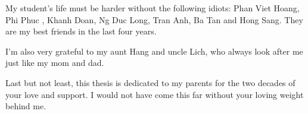 
My student's life must be harder without the following idiots: Phan Viet Hoang, Phi Phuc , Khanh Doan, Ng Duc Long, Tran Anh, Ba Tan and Hong Sang. They are my best friends in the last four years.

I'm also very grateful to my aunt Hang and uncle Lich, who always look after me just like my mom and dad. 

Last but not least, this thesis is dedicated to my parents for the two decades of your love and support. I would not have come this far without your loving weight behind me.
% 